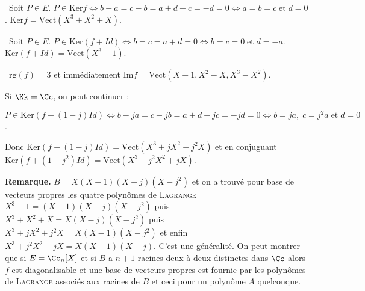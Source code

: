{{\textbullet~Soit $P\in E$. $P\in\text{Ker}f\Leftrightarrow b-a = c-b = a+d-c = -d = 0\Leftrightarrow a=b=c\;\text{et}\;d=0$. $\text{Ker}f=\text{Vect}(X^3+X^2+X)$.

\textbullet~Soit $P\in E$. $P\in\text{Ker}(f+Id)\Leftrightarrow b=c=a+d = 0\Leftrightarrow b=c=0\;\text{et}\;d=-a$. $\text{Ker}(f+Id)= \text{Vect}(X^3-1)$.

\textbullet~$\text{rg}(f) = 3$ et immédiatement $\text{Im}f =\text{Vect}(X-1,X^2-X,X^3-X^2)$.

Si $\Kk=\Cc$, on peut continuer :

$P\in\text{Ker}(f+(1-j)Id)\Leftrightarrow b-ja = c-jb = a + d - jc = - jd = 0\Leftrightarrow b = ja,\;c = j^2a\;\text{et}\;d=0$.

Donc  
$\text{Ker}(f+(1-j)Id)=\text{Vect}(X^3+jX^2+j^2X)$ et en conjuguant $\text{Ker}(f+(1-j^2)Id) =\text{Vect}(X^3+j^2X^2+jX)$.

\textbf{Remarque.} $B =X(X-1)(X-j)(X-j^2)$ et on a trouvé pour base de vecteurs propres les quatre polynômes de \textsc{Lagrange} $X^3-1 = (X-1)(X-j)(X-j^2)$ puis $X^3+X^2+X = X(X-j)(X-j^2)$ puis $X^3+jX^2+j^2X =X(X-1)(X-j^2)$ et enfin $X^3+j^2X^2+jX = X(X-1)(X-j )$. C'est une généralité. On peut montrer que si $E =\Cc_n[X]$ et si $B$ a $n+1$ racines deux à deux distinctes dans $\Cc$ alors $f$ est diagonalisable et une base de vecteurs propres est fournie par les polynômes de \textsc{Lagrange} associés aux racines de $B$ et ceci pour un polynôme $A$ quelconque.
}
}
